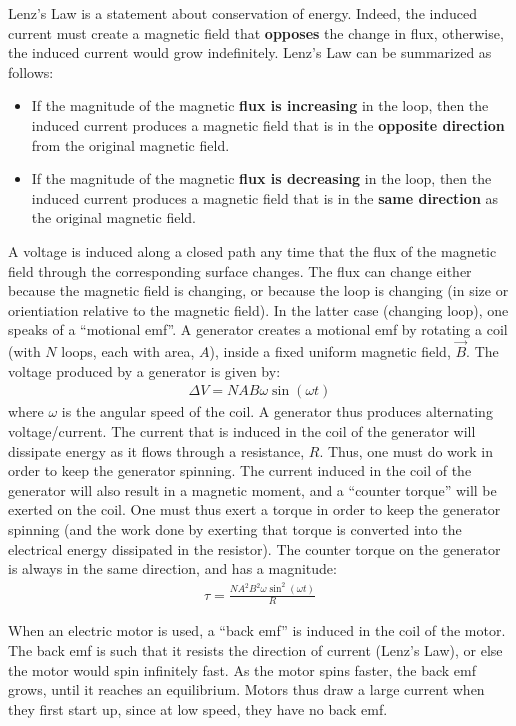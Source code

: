 \begin{chapterSummary}
Lenz's Law is a statement about conservation of energy. Indeed, the induced current must create a magnetic field that \textbf{opposes} the change in flux, otherwise, the induced current would grow indefinitely. Lenz's Law can be summarized as follows:
\begin{itemize}
\item If the magnitude of the magnetic \textbf{flux is increasing} in the loop, then the induced current produces a magnetic field that is in the \textbf{opposite direction} from the original magnetic field.
\item If the magnitude of the magnetic \textbf{flux is decreasing} in the loop, then the induced current produces a magnetic field that is in the \textbf{same direction} as the original magnetic field.
\end{itemize}

A voltage is induced along a closed path any time that the flux of the magnetic field through the corresponding surface changes. The flux can change either because the magnetic field is changing, or because the loop is changing (in size or orientiation relative to the magnetic field). In the latter case (changing loop), one speaks of a ``motional emf''. A generator creates a motional emf by rotating a coil (with $N$ loops, each with area, $A$), inside a fixed uniform magnetic field, $\vec B$. The voltage produced by a generator is given by:
\begin{align*}
\Delta V = NAB\omega\sin(\omega t)
\end{align*}
where $\omega$ is the angular speed of the coil. A generator thus produces alternating voltage/current. The current that is induced in the coil of the generator will dissipate energy as it flows through a resistance, $R$. Thus, one must do work in order to keep the generator spinning. The current induced in the coil of the generator will also result in a magnetic moment, and a ``counter torque'' will be exerted on the coil. One must thus exert a torque in order to keep the generator spinning (and the work done by exerting that torque is converted into the electrical energy dissipated in the resistor). The counter torque on the generator is always in the same direction, and has a magnitude:
\begin{align*}
\tau = \frac{NA^2B^2\omega\sin^2(\omega t)}{R}
\end{align*}

When an electric motor is used, a ``back emf'' is induced in the coil of the motor. The back emf is such that it resists the direction of current (Lenz's Law), or else the motor would spin infinitely fast. As the motor spins faster, the back emf grows, until it reaches an equilibrium. Motors thus draw a large current when they first start up, since at low speed, they have no back emf. 


\end{chapterSummary}
